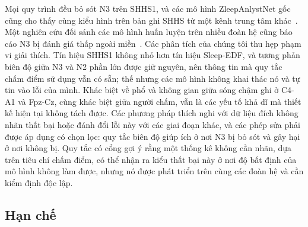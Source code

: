 \documentclass[11pt,a4paper]{article}
\begin{document}
Mọi quy trình đều bỏ sót N3 trên SHHS1, và các mô hình ZleepAnlystNet gốc cũng cho thấy cùng kiểu hình trên bản ghi
SHHS từ một kênh trung tâm khác~\cite{jadhav2024zleepanlystnet}. Một nghiên cứu đối sánh các mô hình huấn luyện
trên nhiều đoàn hệ cũng báo cáo N3 bị đánh giá thấp ngoài miền~\cite{deirossi2025sleepyland}. Các phân tích của
chúng tôi thu hẹp phạm vi giải thích. Tín hiệu SHHS1 không nhỏ hơn tín hiệu Sleep-EDF, và tương phản biên độ giữa
N3 và N2 phần lớn được giữ nguyên, nên thông tin mà quy tắc chấm điểm sử dụng vẫn có sẵn; thế nhưng các mô hình
không khai thác nó và tự tin vào lỗi của mình. Khác biệt về phổ và không gian giữa sóng chậm ghi ở C4-A1 và
Fpz-Cz, cùng khác biệt giữa người chấm, vẫn là các yếu tố khả dĩ mà thiết kế hiện tại không tách được. Các phương
pháp thích nghi với dữ liệu đích không nhãn thất bại hoặc đánh đổi lỗi này với các giai đoạn khác, và các phép sửa
phải được áp dụng có chọn lọc: quy tắc biên độ giúp ích ở nơi N3 bị bỏ sót và gây hại ở nơi không bị. Quy tắc có
cổng gợi ý rằng một thống kê không cần nhãn, dựa trên tiêu chí chấm điểm, có thể nhận ra kiểu thất bại này ở nơi
độ bất định của mô hình không làm được, nhưng nó được phát triển trên cùng các đoàn hệ và cần kiểm định độc lập.

\subsection{Hạn chế}
\end{document}
